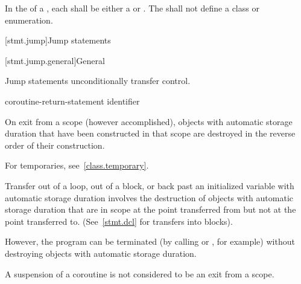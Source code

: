 \pnum
In the  of a ,
each  shall be either a 
or . The  shall not define a
class or enumeration.%

[stmt.jump]{Jump statements}%

[stmt.jump.general]{General}%

\pnum
Jump statements unconditionally transfer control.
%

%
%
%
%
%
%
\begin{bnf}
\br
     \terminal{;}\br
     \terminal{;}\br
      \terminal{;}\br
    coroutine-return-statement\br
     identifier \terminal{;}
\end{bnf}

\pnum
{}%
%
On exit from a scope (however accomplished), objects with automatic storage
duration that have been constructed in that scope are destroyed
in the reverse order of their construction.
\begin{note}
For temporaries,
see~\ref{class.temporary}.
\end{note}
Transfer out of a loop, out of a block, or back
past
an initialized variable with automatic storage duration involves the
destruction of objects with automatic storage duration that are in
scope at the point transferred from but not at the point transferred to.
(See~\ref{stmt.dcl} for transfers into blocks).
\begin{note}
However, the program can be terminated (by calling
%
%
 or
%
%
, for example) without
destroying objects with automatic storage duration.
\end{note}
\begin{note}
A suspension of a coroutine is not considered to be an exit from a scope.
\end{note}

